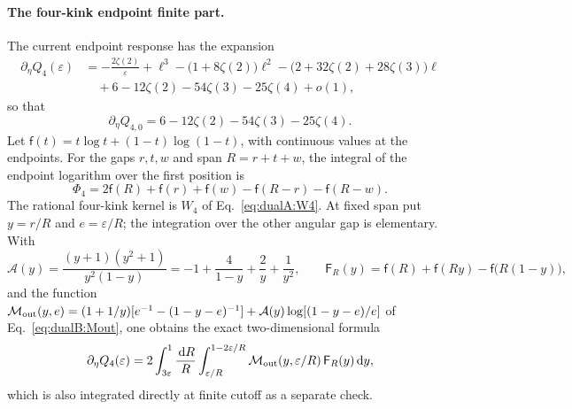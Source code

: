 \documentclass[11pt,a4paper]{article}
\numberwithin{equation}{section}
\newcommand{\dd}{\,\mathrm d}
\begin{document}
\paragraph{The four-kink endpoint finite part.} The current endpoint response has the expansion
\begin{equation}
\begin{aligned}
 \partial_\eta Q_4(\varepsilon)&=-\frac{2\zeta(2)}{\varepsilon}+\ell^3-\bigl(1+8\zeta(2)\bigr)\ell^2
 -\bigl(2+32\zeta(2)+28\zeta(3)\bigr)\ell\\
 &\quad+6-12\zeta(2)-54\zeta(3)-25\zeta(4)+o(1),
\end{aligned}
\label{eq:dualB:ep4asympt}
\end{equation}
so that
\begin{equation}
 \partial_\eta Q_{4,0}=6-12\zeta(2)-54\zeta(3)-25\zeta(4).
 \label{eq:dualB:ep4}
\end{equation}
Let $\mathsf f(t)=t\log t+(1-t)\log(1-t)$, with continuous values at the endpoints. For the gaps $r,t,w$ and span
$R=r+t+w$, the integral of the endpoint logarithm over the first position is
\begin{equation}
 \Phi_4=2\mathsf f(R)+\mathsf f(r)+\mathsf f(w)-\mathsf f(R-r)-\mathsf f(R-w).
\end{equation}
The rational four-kink kernel is $W_4$ of Eq.~\eqref{eq:dualA:W4}. At fixed span put $y=r/R$ and $e=\varepsilon/R$;
the integration over the other angular gap is elementary. With
\begin{equation}
 \mathcal A(y)=\frac{(y+1)(y^2+1)}{y^2(1-y)}=-1+\frac4{1-y}+\frac2y+\frac1{y^2},\qquad
 \mathsf F_R(y)=\mathsf f(R)+\mathsf f(Ry)-\mathsf f\bigl(R(1-y)\bigr),
\end{equation}
and the function $\mathcal M_{\rm out}(y,e)=(1+1/y)[e^{-1}-(1-y-e)^{-1}]+\mathcal A(y)\log[(1-y-e)/e]$ of
Eq.~\eqref{eq:dualB:Mout}, one obtains the exact two-dimensional formula
\begin{equation}
 \partial_\eta Q_4(\varepsilon)=2\int_{3\varepsilon}^1\frac{\dd R}{R}\int_{\varepsilon/R}^{1-2\varepsilon/R}
 \mathcal M_{\rm out}(y,\varepsilon/R)\,\mathsf F_R(y)\dd y,
 \label{eq:dualB:ep4kernel}
\end{equation}
which is also integrated directly at finite cutoff as a separate check.
\end{document}
